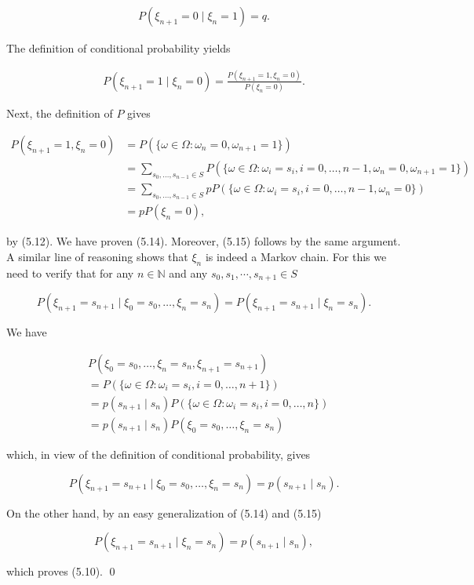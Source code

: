 \begin{Proof}
\begin{align}
P(\xi_{n+1} = 0 \mid \xi_n = 1) = q. \tag{5.15}
\end{align}

The definition of conditional probability yields

\begin{align}
P(\xi_{n+1} = 1 \mid \xi_n = 0) = \frac{P(\xi_{n+1} = 1, \xi_n = 0)}{P(\xi_n = 0)}.
\end{align}

Next, the definition of $P$ gives

\begin{equation}
\begin{aligned}
P(\xi_{n+1} = 1, \xi_n = 0)
&= P(\{\omega\in\Omega : \omega_n = 0, \omega_{n+1} = 1\}) \\
&= \sum_{s_0,\ldots,s_{n-1}\in S} P(\{\omega\in\Omega : \omega_i = s_i, i=0,\ldots,n-1, \omega_n = 0, \omega_{n+1} = 1\}) \\
&= \sum_{s_0,\ldots,s_{n-1}\in S} p P(\{\omega\in\Omega : \omega_i = s_i, i=0,\ldots,n-1, \omega_n = 0\}) \\
&= p P(\xi_n = 0),
\end{aligned}
\end{equation}

by (5.12). We have proven (5.14). Moreover, (5.15) follows by the same argument. A similar line of reasoning shows that $\xi_n$ is indeed a Markov chain. For this we need to verify that for any $n\in\mathbb{N}$ and any $s_0, s_1, \cdots, s_{n+1}\in S$

\begin{equation}
P(\xi_{n+1} = s_{n+1} \mid \xi_0 = s_0, \ldots, \xi_n = s_n) = P(\xi_{n+1} = s_{n+1} \mid \xi_n = s_n).
\end{equation}

We have

\begin{equation}
\begin{aligned}
&P(\xi_0 = s_0, \ldots, \xi_n = s_n, \xi_{n+1} = s_{n+1}) \\
&= P(\{\omega\in\Omega : \omega_i = s_i, i=0,\ldots,n+1\}) \\
&= p(s_{n+1} \mid s_n) P(\{\omega\in\Omega : \omega_i = s_i, i=0,\ldots,n\}) \\
&= p(s_{n+1} \mid s_n) P(\xi_0 = s_0, \ldots, \xi_n = s_n)
\end{aligned}
\end{equation}

which, in view of the definition of conditional probability, gives

\begin{equation}
P(\xi_{n+1} = s_{n+1} \mid \xi_0 = s_0, \ldots, \xi_n = s_n) = p(s_{n+1} \mid s_n).
\end{equation}

On the other hand, by an easy generalization of (5.14) and (5.15)

\begin{equation}
P(\xi_{n+1} = s_{n+1} \mid \xi_n = s_n) = p(s_{n+1} \mid s_n),
\end{equation}

which proves (5.10). \qed
\end{Proof}

